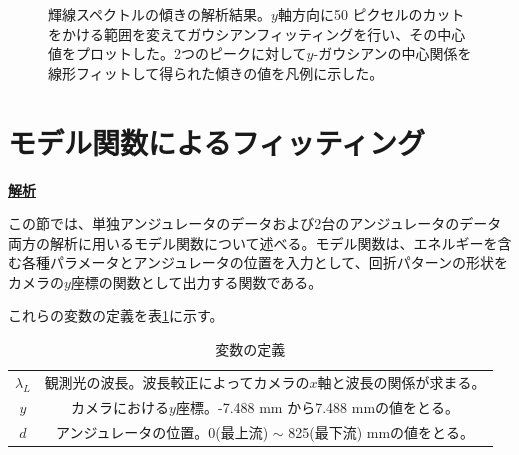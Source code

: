 \documentclass[a4paper,11pt,uplatex]{jsbook}
\begin{document}
\begin{figure}[h]
\begin{subfigure}[h]{0.45\linewidth}
  \end{subfigure}
  \caption[水銀灯の波長較正-3]{輝線スペクトルの傾きの解析結果。$y$軸方向に50 ピクセルのカットをかける範囲を変えてガウシアンフィッティングを行い、その中心値をプロットした。2つのピークに対して$y$-ガウシアンの中心関係を線形フィットして得られた傾きの値を凡例に示した。}\label{tiltfit}
\end{figure}

\section{モデル関数によるフィッティング}
\noindent \textbf{\underline{解析}}\par
この節では、単独アンジュレータのデータおよび2台のアンジュレータのデータ両方の解析に用いるモデル関数について述べる。モデル関数は、エネルギーを含む各種パラメータとアンジュレータの位置を入力として、回折パターンの形状をカメラの$y$座標の関数として出力する関数である。


これらの変数の定義を表\ref{tab:variables}に示す。
\begin{table}[h]
  \centering
  \begin{tabular}{c|c}
    $\lambda_L$ & 観測光の波長。波長較正によってカメラの$x$軸と波長の関係が求まる。\\
    $y$ & カメラにおける$y$座標。-7.488 mm から7.488 mmの値をとる。\\
    $d$ & アンジュレータの位置。0(最上流) $\sim$ 825(最下流) mmの値をとる。\\
  \end{tabular}
  \caption[変数の定義]{変数の定義}\label{tab:variables}
\end{table}
\end{document}
